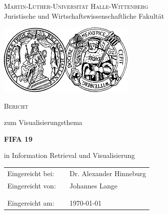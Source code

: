 \documentclass[paper=a4,12pt,titlepage,listof=totoc]{scrartcl}
\begin{document}




\begin{titlepage}
	\begin{center}
		\large{\textsc{Martin-Luther-Universität Halle-Wittenberg}}\\
				Juristische und Wirtschaftswissenschaftliche Fakultät
	\end{center}
	
	\vskip 0.75cm
	
	\begin{center}
		\includegraphics[width=0.5\textwidth]{grafiken/Double_seal_University_of_Halle-Wittenberg}
	\end{center}

	\vskip 1cm
	
	\begin{center}
		\textsc{Bericht}
	\end{center}
	
	\begin{center}
		zum Visualisierungsthema \\ 
	\end{center}

	\begin{center}
		\Large
		\textbf{FIFA 19}
	\end{center}
	\begin{center}
		 in Information Retrieval und Visualisierung \\
	\end{center}

	\vskip 1cm

	\vskip 0.75cm

	\begin{center}
		\begin{tabular}{lll}
			Eingereicht bei:  && Dr. Alexander Hinneburg \\
			Eingereicht von:  && Johannes Lange \\
			& & \\
			& & \\
			Eingereicht am: & & \today
		\end{tabular}
	\end{center}

\end{titlepage}
\end{document}
